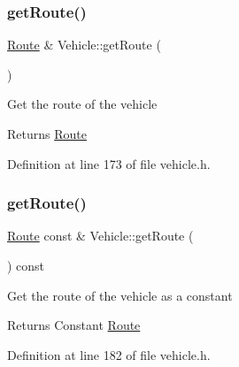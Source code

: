 \mbox{\label{class_vehicle_a53ff209740804a59014c90eff4a4a386}} 
\subsubsection{\texorpdfstring{get\+Route()}{getRoute()}\hspace{0.1cm}{\footnotesize\ttfamily [1/2]}}
{\footnotesize\ttfamily \hyperlink{class_route}{Route} \& Vehicle\+::get\+Route (\begin{DoxyParamCaption}{ }\end{DoxyParamCaption})\hspace{0.3cm}{\ttfamily [inline]}}

Get the route of the vehicle \begin{DoxyReturn}{Returns}
\hyperlink{class_route}{Route} 
\end{DoxyReturn}


Definition at line 173 of file vehicle.\+h.

\mbox{\label{class_vehicle_a0c5a76433d16b806fe5abdcfc8ffeb22}} 
\subsubsection{\texorpdfstring{get\+Route()}{getRoute()}\hspace{0.1cm}{\footnotesize\ttfamily [2/2]}}
{\footnotesize\ttfamily \hyperlink{class_route}{Route} const  \& Vehicle\+::get\+Route (\begin{DoxyParamCaption}{ }\end{DoxyParamCaption}) const\hspace{0.3cm}{\ttfamily [inline]}}

Get the route of the vehicle as a constant \begin{DoxyReturn}{Returns}
Constant \hyperlink{class_route}{Route} 
\end{DoxyReturn}


Definition at line 182 of file vehicle.\+h.

\mbox{\label{class_vehicle_a5b63ad191aa37fb3e66cec0c9b0b3b0f}} 
